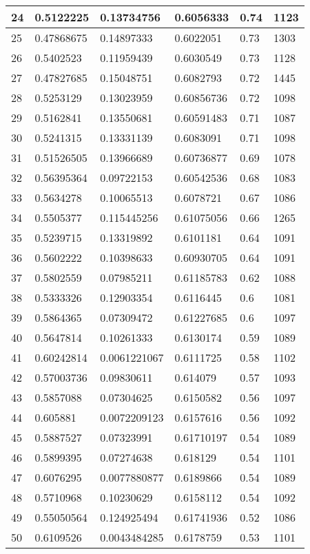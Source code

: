 \begin{longtable}{|l|l|l|l|l|l|}
24 & 0.5122225 & 0.13734756 & 0.6056333 & 0.74 & 1123 \\ \hline 
25 & 0.47868675 & 0.14897333 & 0.6022051 & 0.73 & 1303 \\ \hline 
26 & 0.5402523 & 0.11959439 & 0.6030549 & 0.73 & 1128 \\ \hline 
27 & 0.47827685 & 0.15048751 & 0.6082793 & 0.72 & 1445 \\ \hline 
28 & 0.5253129 & 0.13023959 & 0.60856736 & 0.72 & 1098 \\ \hline 
29 & 0.5162841 & 0.13550681 & 0.60591483 & 0.71 & 1087 \\ \hline 
30 & 0.5241315 & 0.13331139 & 0.6083091 & 0.71 & 1098 \\ \hline 
31 & 0.51526505 & 0.13966689 & 0.60736877 & 0.69 & 1078 \\ \hline 
32 & 0.56395364 & 0.09722153 & 0.60542536 & 0.68 & 1083 \\ \hline 
33 & 0.5634278 & 0.10065513 & 0.6078721 & 0.67 & 1086 \\ \hline 
34 & 0.5505377 & 0.115445256 & 0.61075056 & 0.66 & 1265 \\ \hline 
35 & 0.5239715 & 0.13319892 & 0.6101181 & 0.64 & 1091 \\ \hline 
36 & 0.5602222 & 0.10398633 & 0.60930705 & 0.64 & 1091 \\ \hline 
37 & 0.5802559 & 0.07985211 & 0.61185783 & 0.62 & 1088 \\ \hline 
38 & 0.5333326 & 0.12903354 & 0.6116445 & 0.6 & 1081 \\ \hline 
39 & 0.5864365 & 0.07309472 & 0.61227685 & 0.6 & 1097 \\ \hline 
40 & 0.5647814 & 0.10261333 & 0.6130174 & 0.59 & 1089 \\ \hline 
41 & 0.60242814 & 0.0061221067 & 0.6111725 & 0.58 & 1102 \\ \hline 
42 & 0.57003736 & 0.09830611 & 0.614079 & 0.57 & 1093 \\ \hline 
43 & 0.5857088 & 0.07304625 & 0.6150582 & 0.56 & 1097 \\ \hline 
44 & 0.605881 & 0.0072209123 & 0.6157616 & 0.56 & 1092 \\ \hline 
45 & 0.5887527 & 0.07323991 & 0.61710197 & 0.54 & 1089 \\ \hline 
46 & 0.5899395 & 0.07274638 & 0.618129 & 0.54 & 1101 \\ \hline 
47 & 0.6076295 & 0.0077880877 & 0.6189866 & 0.54 & 1089 \\ \hline 
48 & 0.5710968 & 0.10230629 & 0.6158112 & 0.54 & 1092 \\ \hline 
49 & 0.55050564 & 0.124925494 & 0.61741936 & 0.52 & 1086 \\ \hline 
50 & 0.6109526 & 0.0043484285 & 0.6178759 & 0.53 & 1101 \\ \hline 
\end{longtable}